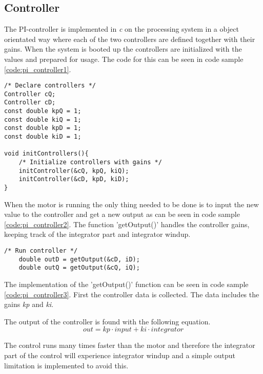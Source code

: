 \subsection{Controller}

The PI-controller is implemented in \textit{c} on the processing system in a object orientated way where each of the two controllers are defined together with their gains. When the system is booted up the controllers are initialized with the values and prepared for usage. The code for this can be seen in code sample \ref{code:pi_controller1}.

\begin{lstlisting}[style=c, caption=Initialization of PI-controller., label=code:pi_controller1]
/* Declare controllers */
Controller cQ;
Controller cD;
const double kpQ = 1;
const double kiQ = 1;
const double kpD = 1;
const double kiD = 1;

void initControllers(){
    /* Initialize controllers with gains */
    initController(&cQ, kpQ, kiQ);
    initController(&cD, kpD, kiD);
}
\end{lstlisting}

When the motor is running the only thing needed to be done is to input the new value to the controller and get a new output as can be seen in code sample \ref{code:pi_controller2}. The function 'getOutput()' handles the controller gains, keeping track of the integrator part and integrator windup.

\begin{lstlisting}[style=c, caption=Usage of PI-controller., label=code:pi_controller2]
    /* Run controller */
    double outD = getOutput(&cD, iD);
    double outQ = getOutput(&cQ, iQ);
\end{lstlisting}

The implementation of the 'getOutput()' function can be seen in code sample \ref{code:pi_controller3}.
First the controller data is collected. The data includes the gains \textit{kp} and \textit{ki}.

The output of the controller is found with the following equation.
\begin{equation}
    out = kp \cdot input + ki \cdot integrator
\end{equation}

The control runs many times faster than the motor and therefore the integrator part of the control will experience integrator windup and a simple output limitation is implemented to avoid this.



